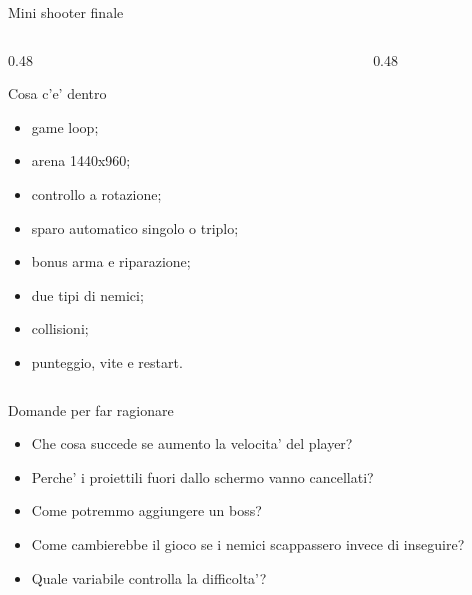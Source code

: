 \documentclass[aspectratio=169]{beamer}
\newcommand{\player}[2]{
  \begin{scope}[shift={(#1,#2)}]
    \draw[fill=Green, draw=white, line width=1.2pt] (0,0) circle (0.32);
    \draw[white, line width=2.2pt, -{Latex[length=3mm]}] (0,0) -- (0.62,0);
    \fill[Ink!70] (0.12,0.1) circle (0.04);
  \end{scope}
}
\newcommand{\enemy}[2]{
  \begin{scope}[shift={(#1,#2)}]
    \draw[fill=Red, draw=white, line width=1pt] (0,0) circle (0.26);
    \fill[Ink!60] (0.08,0.08) circle (0.04);
  \end{scope}
}
\newcommand{\shot}[2]{
  \fill[Yellow] (#1,#2) circle (0.08);
}
\begin{document}
\begin{frame}{Mini shooter finale}
  \begin{columns}[T]
    \begin{column}{0.48\textwidth}
      \begin{block}{Cosa c'e' dentro}
        \begin{itemize}
          \item game loop;
          \item arena 1440x960;
          \item controllo a rotazione;
          \item sparo automatico singolo o triplo;
          \item bonus arma e riparazione;
          \item due tipi di nemici;
          \item collisioni;
          \item punteggio, vite e restart.
        \end{itemize}
      \end{block}
    \end{column}
    \begin{column}{0.48\textwidth}
      \centering
    \end{column}
  \end{columns}
\end{frame}

\begin{frame}{Domande per far ragionare}
  \begin{itemize}
    \item Che cosa succede se aumento la velocita' del player?
    \item Perche' i proiettili fuori dallo schermo vanno cancellati?
    \item Come potremmo aggiungere un boss?
    \item Come cambierebbe il gioco se i nemici scappassero invece di inseguire?
    \item Quale variabile controlla la difficolta'?
  \end{itemize}
\end{frame}
\end{document}
